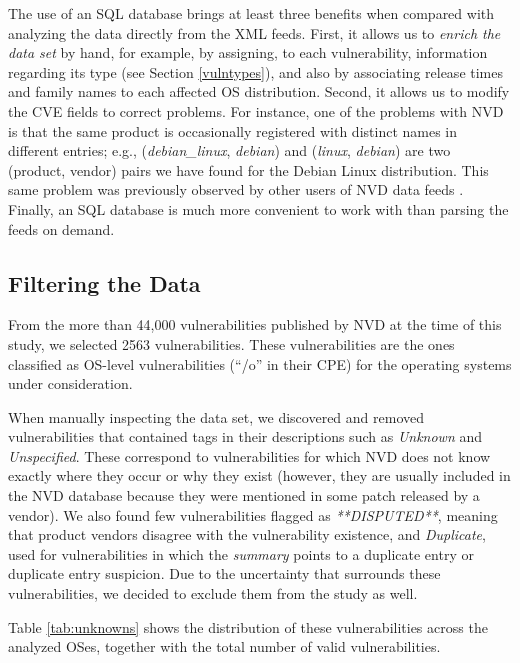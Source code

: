 The use of an SQL database brings at least three benefits when compared with analyzing the data directly from the XML feeds.
First, it allows us to \emph{enrich the data set} by hand, for example, by assigning, to each vulnerability, information regarding its type (see Section \ref{vulntypes}), and also by associating release times and family names to each affected OS distribution.
Second, it allows us to modify the CVE fields to correct problems.
For instance, one of the problems with NVD is that the same product is occasionally registered with distinct names in different entries; e.g.,
(\textit{debian\_linux}, \textit{debian}) and (\textit{linux}, \textit{debian}) are two (product, vendor) pairs we have found for the Debian Linux distribution.
This same problem was previously observed by other users of NVD data feeds \cite{cvedetails}.
Finally, an SQL database is much more convenient to work with than parsing the feeds on demand.

\subsection{Filtering the Data}\label{filtering_data}


From the more than 44,000 vulnerabilities published by NVD at the time of this study, we selected 2563 vulnerabilities.
These vulnerabilities are the ones classified as OS-level vulnerabilities (``/o'' in their CPE) for the operating systems under consideration.

When manually inspecting the data set, we discovered and removed vulnerabilities that contained tags in their descriptions such as \emph{Unknown} and \emph{Unspecified}. These correspond to vulnerabilities for which NVD does not know exactly where they occur or why they exist (however, they are usually included in the NVD database because they were mentioned in some patch released by a vendor). We also found few vulnerabilities flagged as \emph{**DISPUTED**}, meaning that product vendors disagree with the vulnerability existence, and \emph{Duplicate}, used for vulnerabilities in which the \emph{summary} points to a duplicate entry or duplicate entry suspicion.
Due to the uncertainty that surrounds these vulnerabilities, we decided to exclude them from the study as well.

Table \ref{tab:unknowns} shows the distribution of these vulnerabilities across the analyzed OSes, together with the total number of valid vulnerabilities.

